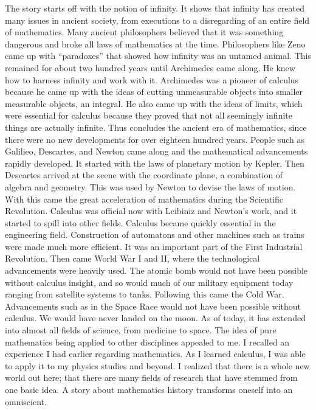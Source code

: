 \documentclass{article}
\begin{document}
\begin{multicols}{3}
The story starts off with the notion of infinity. It shows that infinity has created many issues in
ancient society, from executions to a disregarding of an entire field of mathematics. Many
ancient philosophers believed that it was something dangerous and broke all laws of
mathematics at the time. Philosophers like Zeno came up with “paradoxes” that showed how
infinity was an untamed animal. This remained for about two hundred years until Archimedes
came along. He knew how to harness infinity and work with it.
Archimedes was a pioneer of calculus because he came up with the ideas of cutting
unmeasurable objects into smaller measurable objects, an integral. He also came up with the
ideas of limits, which were essential for calculus because they proved that not all seemingly
infinite things are actually infinite. Thus concludes the ancient era of mathematics, since there
were no new developments for over eighteen hundred years.
People such as Galilieo, Descartes, and Newton came along and the mathematical
advancements rapidly developed. It started with the laws of planetary motion by Kepler. Then
Descartes arrived at the scene with the coordinate plane, a combination of algebra and
geometry. This was used by Newton to devise the laws of motion. With this came the great
acceleration of mathematics during the Scientific Revolution. Calculus was official now with
Leibiniz and Newton’s work, and it started to spill into other fields.
Calculus became quickly essential in the engineering field. Construction of automatons and
other machines such as trains were made much more efficient. It was an important part of the
First Industrial Revolution. Then came World War I and II, where the technological
advancements were heavily used. The atomic bomb would not have been possible without
calculus insight, and so would much of our military equipment today ranging from satellite
systems to tanks. Following this came the Cold War. Advancements such as in the Space Race
would not have been possible without calculus. We would have never landed on the moon. As
of today, it has extended into almost all fields of science, from medicine to space.
The idea of pure mathematics being applied to other disciplines appealed to me. I recalled an
experience I had earlier regarding mathematics. As I learned calculus, I was able to apply it to
my physics studies and beyond. I realized that there is a whole new world out here; that there
are many fields of research that have stemmed from one basic idea. A story about mathematics
history transforms oneself into an omniscient.
\closearticle


\end{multicols}
\end{document}
